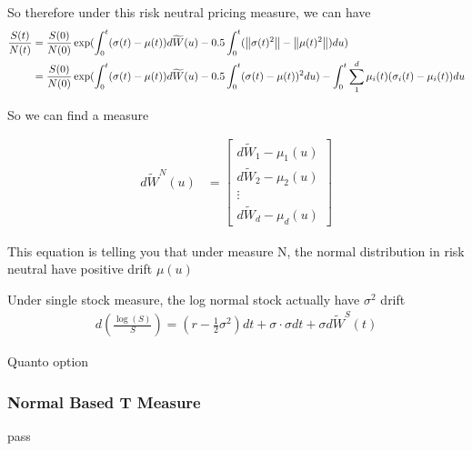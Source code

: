 \documentclass[11pt, oneside]{article}   	%
\begin{document}
So therefore under this risk neutral pricing measure, we can have
\begin{equation}
  \begin{aligned}
  \frac{S(t)}{N(t)} &= \frac{S(0)}{N(0)} \exp(\int_{0}^{t} (\sigma(t) - \mu(t)) d\widetilde{W}(u) - 0.5\int_{0} ^ {t} (\left\lVert\sigma(t) ^ 2\right\rVert - \left\lVert\mu(t) ^ 2\right\rVert) du) \\
                    &= \frac{S(0)}{N(0)} \exp(\int_{0}^{t} (\sigma(t) - \mu(t)) d\widetilde{W}(u) - 0.5\int_{0} ^ {t} (\sigma(t) - \mu(t)) ^ 2 du) - \int_0^t\sum_{1} ^ {d} \mu_{i}(t)(\sigma_{i}(t) - \mu_{i}(t)) du
  \end{aligned}
\end{equation}

So we can find a measure

\begin{equation}
  \begin{aligned}
    d\widetilde{W}^N(u) &= \begin{bmatrix}
            d\widetilde{W}_{1}  - \mu_1(u)\\
            d\widetilde{W}_{2}  - \mu_2(u)\\
            \vdots \\
            d\widetilde{W}_{d}  - \mu_d(u)
          \end{bmatrix}
    \end{aligned}
\end{equation}

This equation is telling you that {\color{red}under measure N, the normal distribution in risk neutral have positive drift $\mu(u)$}

\begin{exmp}
Under single stock measure, the log normal stock actually have $\sigma ^ 2$ drift
\begin{equation}
  \begin{aligned}
  d(\frac{\log(S)}{S}) = (r - \frac{1}{2} \sigma^2)dt + \sigma \cdot \sigma dt + \sigma d\widetilde{W}^S(t)
  \end{aligned}
\end{equation}
\end{exmp}

\begin{exmp}
Quanto option
\end{exmp}


\subsubsection{Normal Based T Measure}
pass
\end{document}
